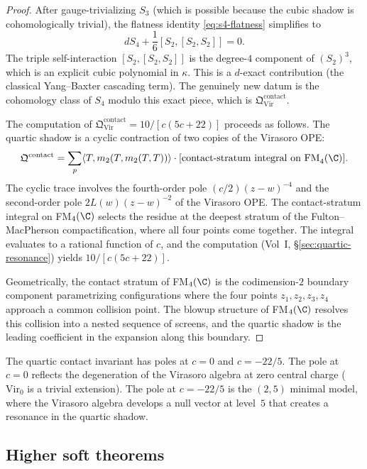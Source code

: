 \begin{proof}
After gauge-trivializing $S_3$ (which is possible because the cubic shadow is
cohomologically trivial), the flatness identity \eqref{eq:s4-flatness} simplifies to
\[
dS_4 + \frac{1}{6}[S_2, [S_2, S_2]] = 0.
\]
The triple self-interaction $[S_2, [S_2, S_2]]$ is the degree-$4$ component of
$(S_2)^3$, which is an explicit cubic polynomial in $\kappa$. This is a $d$-exact
contribution (the classical Yang--Baxter cascading term). The genuinely new datum is
the cohomology class of $S_4$ modulo this exact piece, which is
$\mathfrak{Q}^{\mathrm{contact}}_{\mathrm{Vir}}$.

The computation of $\mathfrak{Q}^{\mathrm{contact}}_{\mathrm{Vir}} = 10/[c(5c+22)]$
proceeds as follows. The quartic shadow is a cyclic contraction of two copies of the
Virasoro OPE:
\[
\mathfrak{Q}^{\mathrm{contact}} = \sum_{p} \langle T, m_2(T, m_2(T, T)) \rangle
\cdot [\text{contact-stratum integral on FM}_4(\C)].
\]
The cyclic trace involves the fourth-order pole $(c/2)(z-w)^{-4}$ and the
second-order pole $2L(w)(z-w)^{-2}$ of the Virasoro OPE. The contact-stratum
integral on FM$_4(\C)$ selects the residue at the deepest stratum of the
Fulton--MacPherson compactification, where all four points come together. The
integral evaluates to a rational function of $c$, and the computation
(Vol~I, \S\ref*{sec:quartic-resonance}) yields $10/[c(5c+22)]$.

Geometrically, the contact stratum of FM$_4(\C)$ is the codimension-$2$ boundary
component parametrizing configurations where the four points $z_1, z_2, z_3, z_4$
approach a common collision point. The blowup structure of FM$_4(\C)$ resolves this
collision into a nested sequence of screens, and the quartic shadow is the leading
coefficient in the expansion along this boundary.
\end{proof}

\begin{remark}
The quartic contact invariant has poles at $c = 0$ and $c = -22/5$. The pole at $c = 0$
reflects the degeneration of the Virasoro algebra at zero central charge ($\mathrm{Vir}_0$
is a trivial extension). The pole at $c = -22/5$ is the $(2,5)$ minimal model, where
the Virasoro algebra develops a null vector at level~$5$ that creates a resonance in
the quartic shadow.
\end{remark}

\subsection{Higher soft theorems}


